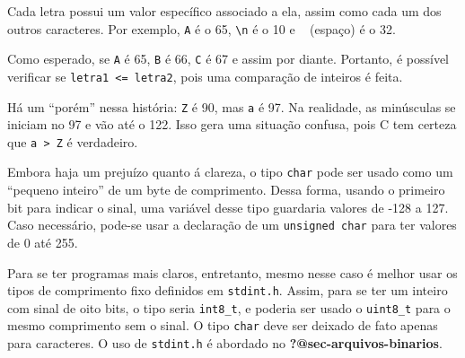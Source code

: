 \documentclass[
  letterpaper,
  DIV=11,
  numbers=noendperiod]{scrartcl}
\begin{document}
\begin{tcolorbox}[enhanced jigsaw, colbacktitle=quarto-callout-warning-color!10!white, left=2mm, coltitle=black, opacitybacktitle=0.6, colframe=quarto-callout-warning-color-frame, toprule=.15mm, bottomrule=.15mm, bottomtitle=1mm, rightrule=.15mm, opacityback=0, arc=.35mm, breakable, leftrule=.75mm, toptitle=1mm, title=\textcolor{quarto-callout-warning-color}{\faExclamationTriangle}\hspace{0.5em}{Curiosidade}, titlerule=0mm, colback=white]

Cada letra possui um valor específico associado a ela, assim como cada
um dos outros caracteres. Por exemplo,
\texttt{\textquotesingle{}A\textquotesingle{}} é o 65,
\texttt{\textquotesingle{}\textbackslash{}n\textquotesingle{}} é o 10 e
\texttt{\textquotesingle{}\ \textquotesingle{}} (espaço) é o 32.

Como esperado, se \texttt{\textquotesingle{}A\textquotesingle{}} é 65,
\texttt{\textquotesingle{}B\textquotesingle{}} é 66,
\texttt{\textquotesingle{}C\textquotesingle{}} é 67 e assim por diante.
Portanto, é possível verificar se \texttt{letra1\ \textless{}=\ letra2},
pois uma comparação de inteiros é feita.

Há um ``porém'' nessa história:
\texttt{\textquotesingle{}Z\textquotesingle{}} é 90, mas
\texttt{\textquotesingle{}a\textquotesingle{}} é 97. Na realidade, as
minúsculas se iniciam no 97 e vão até o 122. Isso gera uma situação
confusa, pois C tem certeza que
\texttt{\textquotesingle{}a\textquotesingle{}\ \textgreater{}\ \textquotesingle{}Z\textquotesingle{}}
é verdadeiro.

\end{tcolorbox}

\begin{tcolorbox}[enhanced jigsaw, colbacktitle=quarto-callout-tip-color!10!white, left=2mm, coltitle=black, opacitybacktitle=0.6, colframe=quarto-callout-tip-color-frame, toprule=.15mm, bottomrule=.15mm, bottomtitle=1mm, rightrule=.15mm, opacityback=0, arc=.35mm, breakable, leftrule=.75mm, toptitle=1mm, title=\textcolor{quarto-callout-tip-color}{\faLightbulb}\hspace{0.5em}{Dica}, titlerule=0mm, colback=white]

Embora haja um prejuízo quanto á clareza, o tipo \texttt{char} pode ser
usado como um ``pequeno inteiro'' de um byte de comprimento. Dessa
forma, usando o primeiro bit para indicar o sinal, uma variável desse
tipo guardaria valores de -128 a 127. Caso necessário, pode-se usar a
declaração de um \texttt{unsigned\ char} para ter valores de 0 até 255.

Para se ter programas mais claros, entretanto, mesmo nesse caso é melhor
usar os tipos de comprimento fixo definidos em \texttt{stdint.h}. Assim,
para se ter um inteiro com sinal de oito bits, o tipo seria
\texttt{int8\_t}, e poderia ser usado o \texttt{uint8\_t} para o mesmo
comprimento sem o sinal. O tipo \texttt{char} deve ser deixado de fato
apenas para caracteres. O uso de \texttt{stdint.h} é abordado no
\textbf{?@sec-arquivos-binarios}.

\end{tcolorbox}
\end{document}
